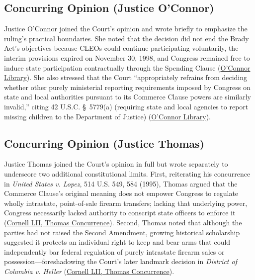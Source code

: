 \documentclass[12pt]{article}
\begin{document}
\subsection{Concurring Opinion (Justice O'Connor)}
Justice O'Connor joined the Court's opinion and wrote briefly to emphasize the ruling's practical boundaries. She noted that the decision did not end the Brady Act's objectives because CLEOs could continue participating voluntarily, the interim provisions expired on November 30, 1998, and Congress remained free to induce state participation contractually through the Spending Clause (\href{https://library.oconnorinstitute.org/supreme-court/printz-v-united-states-1996/}{O'Connor Library}). She also stressed that the Court ``appropriately refrains from deciding whether other purely ministerial reporting requirements imposed by Congress on state and local authorities pursuant to its Commerce Clause powers are similarly invalid,'' citing 42 U.S.C. \S\ 5779(a) (requiring state and local agencies to report missing children to the Department of Justice) (\href{https://library.oconnorinstitute.org/supreme-court/printz-v-united-states-1996/}{O'Connor Library}).

\subsection{Concurring Opinion (Justice Thomas)}
Justice Thomas joined the Court's opinion in full but wrote separately to underscore two additional constitutional limits. First, reiterating his concurrence in \textit{United States v. Lopez}, 514 U.S. 549, 584 (1995), Thomas argued that the Commerce Clause's original meaning does not empower Congress to regulate wholly intrastate, point-of-sale firearm transfers; lacking that underlying power, Congress necessarily lacked authority to conscript state officers to enforce it (\href{https://www.law.cornell.edu/supct/html/95-1478.ZC1.html}{Cornell LII, Thomas Concurrence}). Second, Thomas noted that although the parties had not raised the Second Amendment, growing historical scholarship suggested it protects an individual right to keep and bear arms that could independently bar federal regulation of purely intrastate firearm sales or possession---foreshadowing the Court's later landmark decision in \textit{District of Columbia v. Heller} (\href{https://www.law.cornell.edu/supct/html/95-1478.ZC1.html}{Cornell LII, Thomas Concurrence}).
\end{document}
